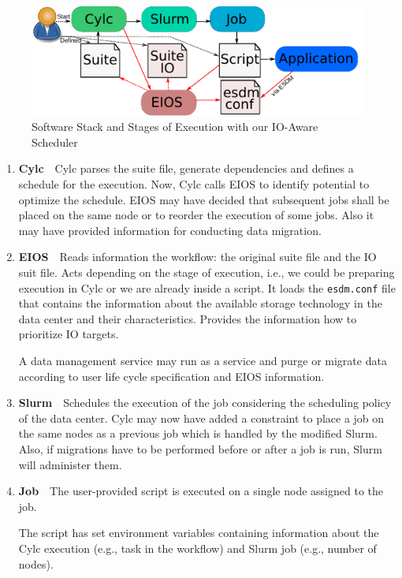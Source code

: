 \documentclass[a4paper]{article}
\begin{document}
\begin{figure}[tb]
  \centering
  \includegraphics[scale=1.4]{stages-io}
  \caption{Software Stack and Stages of Execution with our IO-Aware Scheduler}
  \label{fig:stages-io}
\end{figure}


\begin{enumerate}
  \item \textbf{Cylc}\ \ Cylc parses the suite file, generate dependencies and defines a schedule for the execution.
  Now, Cylc calls EIOS to identify potential to optimize the schedule.
  EIOS may have decided that subsequent jobs shall be placed on the same node or to reorder the execution of some jobs.
  Also it may have provided information for conducting data migration.

  \item \textbf{EIOS}\ \
  Reads information the workflow: the original suite file and the IO suit file.
  Acts depending on the stage of execution, i.e., we could be preparing execution in Cylc or we are already inside a script.
  It loads the \texttt{esdm.conf} file that contains the information about the available storage technology in the data center and their characteristics.
  Provides the information how to prioritize IO targets.

  A data management service may run as a service and purge or migrate data according to user life cycle specification and EIOS information.

  \item \textbf{Slurm}\ \ Schedules the execution of the job considering the scheduling policy of the data center.
  Cylc may now have added a constraint to place a job on the same nodes as a previous job which is handled by the modified Slurm.
  Also, if migrations have to be performed before or after a job is run, Slurm will administer them.

  \item \textbf{Job}\ \ The user-provided script is executed on a single node assigned to the job.

  The script has set environment variables containing information about the Cylc execution (e.g., task in the workflow) and Slurm job (e.g., number of nodes).


\end{enumerate}
\end{document}
